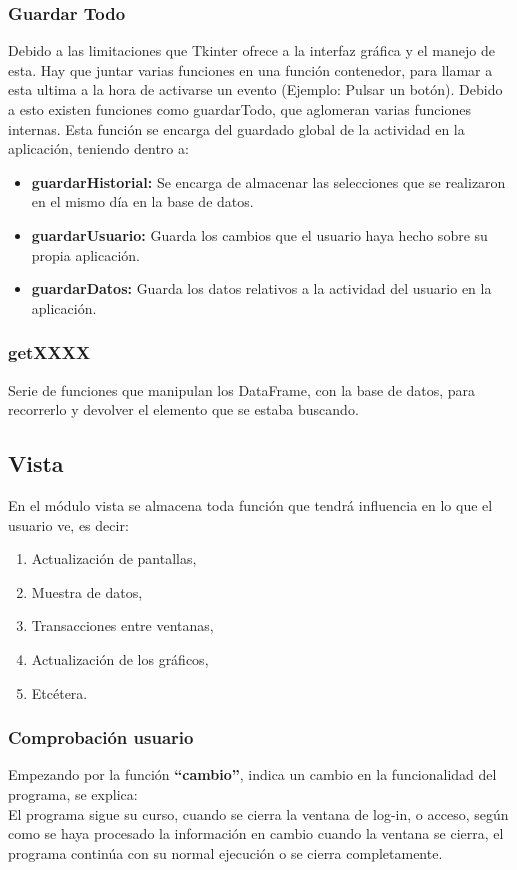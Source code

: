 \subsubsection{Guardar Todo}
Debido a las limitaciones que Tkinter ofrece a la interfaz gráfica y el manejo de esta. Hay que juntar varias funciones en una función contenedor, para llamar a esta ultima a la hora de activarse un evento (Ejemplo: Pulsar un botón). Debido a esto existen funciones como guardarTodo, que aglomeran varias funciones internas. Esta función se encarga del guardado global de la actividad en la aplicación, teniendo dentro a:
\begin{itemize}
\item	\textbf{guardarHistorial:} Se encarga de almacenar las selecciones que se realizaron en el mismo día en la base de datos.
\item	\textbf{guardarUsuario:} Guarda  los cambios que el usuario haya hecho sobre su propia aplicación.
\item	\textbf{guardarDatos:} Guarda los datos relativos a la actividad del usuario en la aplicación.
\end{itemize}

\subsubsection{getXXXX}
Serie de funciones que manipulan los DataFrame, con la base de datos, para recorrerlo y devolver el elemento que se estaba buscando.
\subsection{Vista}
En el módulo vista se almacena toda función que tendrá influencia en lo que el usuario ve, es decir:
\begin{enumerate}
\item Actualización de pantallas,
\item Muestra de datos,
\item Transacciones entre ventanas,
\item Actualización de los gráficos,
\item Etcétera.
\end{enumerate} 

\subsubsection{Comprobación usuario}
Empezando por la función \textbf{“cambio”}, indica un cambio en la funcionalidad del programa, se explica:\\
El programa sigue su curso, cuando se cierra la ventana de log-in, o acceso, según como se haya procesado la información en cambio cuando la ventana se cierra, el programa continúa con su normal ejecución o se cierra completamente.\\

